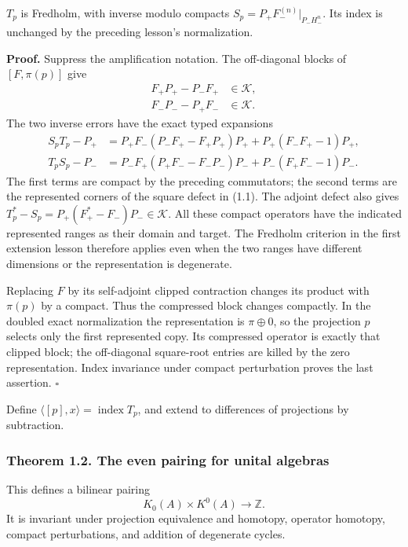 \documentclass[
  11pt,
]{article}
\begin{document}
\(T_p\) is Fredholm, with inverse modulo compacts
\(S_p=P_+F_-^{(n)}|_{P_-H_-^n}\). Its index is unchanged by the
preceding lesson's normalization.

\textbf{Proof.} Suppress the amplification notation. The off-diagonal
blocks of \([F,\pi(p)]\) give \[
\begin{aligned}
F_+P_+-P_-F_+&\in\mathcal K,\\
F_-P_--P_+F_-&\in\mathcal K.
\end{aligned}
\] The two inverse errors have the exact typed expansions \[
\begin{aligned}
S_pT_p-P_+
&=P_+F_-(P_-F_+-F_+P_+)P_+
  +P_+(F_-F_+-1)P_+,\\
T_pS_p-P_-
&=P_-F_+(P_+F_--F_-P_-)P_-
  +P_-(F_+F_--1)P_- .
\end{aligned}
\] The first terms are compact by the preceding commutators; the second
terms are the represented corners of the square defect in (1.1). The
adjoint defect also gives \(T_p^*-S_p=P_+(F_+^*-F_-)P_-\in\mathcal K\).
All these compact operators have the indicated represented ranges as
their domain and target. The Fredholm criterion in the first extension
lesson therefore applies even when the two ranges have different
dimensions or the representation is degenerate.

Replacing \(F\) by its self-adjoint clipped contraction changes its
product with \(\pi(p)\) by a compact. Thus the compressed block changes
compactly. In the doubled exact normalization the representation is
\(\pi\oplus0\), so the projection \(p\) selects only the first
represented copy. Its compressed operator is exactly that clipped block;
the off-diagonal square-root entries are killed by the zero
representation. Index invariance under compact perturbation proves the
last assertion. \(\square\)

Define \(\langle[p],x\rangle=\operatorname{index}T_p\), and extend to
differences of projections by subtraction.

\subsubsection{Theorem 1.2. The even pairing for unital
algebras}\label{theorem-1.2.-the-even-pairing-for-unital-algebras}

This defines a bilinear pairing \[
K_0(A)\times K^0(A)\longrightarrow\mathbb Z.
\tag{1.2}
\] It is invariant under projection equivalence and homotopy, operator
homotopy, compact perturbations, and addition of degenerate cycles.
\end{document}
